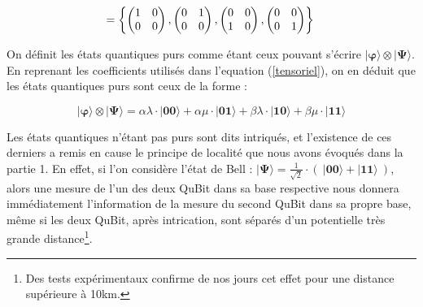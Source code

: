 \documentclass[a4paper,12pt]{report}
\newcommand{\quSt}[1]{\bm{|#1\rangle}}
\newcommand{\icite}[1]{\up{\textit{\cite{#1}}}}
\begin{document}
\vspace{1\baselineskip}

\begin{equation}
	 =  \left\{ \left( \begin{matrix} 1 & 0 \\ 0 & 0 \end{matrix} \right ), \left( \begin{matrix} 0 & 1 \\ 0 & 0 \end{matrix} \right ), \left( \begin{matrix} 0 & 0 \\ 1 & 0 \end{matrix} \right ), \left( \begin{matrix} 0 & 0 \\ 0 & 1 \end{matrix} \right ) \right\} \\
\end{equation}

\vspace{1\baselineskip}

\par{
	On définit les états quantiques purs\icite{ref4} comme étant ceux pouvant s'écrire $\quSt{\varphi} \otimes \quSt{\Psi}$. En reprenant les coefficients utilisés dans l'equation (\ref{tensoriel}), on en déduit que les états quantiques purs sont ceux de la forme :
}

\begin{equation}
	\quSt{\varphi} \otimes \quSt{\Psi} = \alpha \lambda \cdot \quSt{00} + \alpha \mu \cdot \quSt{01} + \beta \lambda \cdot \quSt{10} + \beta \mu \cdot \quSt{11}
\end{equation}

\vspace{1\baselineskip}

\par{
	Les états quantiques n'étant pas purs sont dits intriqués, et l'existence de ces derniers a remis en cause le principe de localité que nous avons évoqués dans la partie 1. En effet, si l'on considère l'état de Bell : $\quSt{\Psi} = \frac{1}{\sqrt{2}} \cdot (~ \quSt{00} + \quSt{11}  ~)$, alors une mesure de l'un des deux QuBit dans sa base respective nous donnera immédiatement l'information de la mesure du second QuBit dans sa propre base, même si les deux QuBit, après intrication, sont séparés d'un potentielle très grande distance\footnote{Des tests expérimentaux confirme de nos jours cet effet pour une distance supérieure à 10km.}.
}
\end{document}
